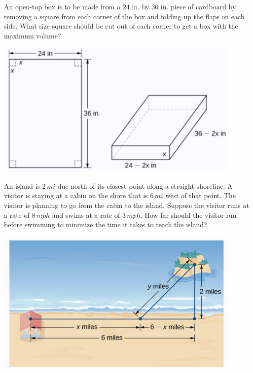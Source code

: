 \begin{example}

An open-top box is to be made from a \(24\) in. by \(36\) in. piece of
cardboard by removing a square from each corner of the box and folding
up the flaps on each side. What size square should be cut out of each
corner to get a box with the maximum volume?

\includegraphics[width=0.9\textwidth]{img/image-20200420233831196.png}

\end{example}
\vspace*{6\baselineskip}

\begin{example}

An island is \(2\,mi\) due north of its closest point along a straight
shoreline. A visitor is staying at a cabin on the shore that is
\(6\,mi\) west of that point. The visitor is planning to go from the
cabin to the island. Suppose the visitor runs at a rate of \(8\,mph\)
and swims at a rate of \(3\,mph\). How far should the visitor run before
swimming to minimize the time it takes to reach the island?

\includegraphics[width=0.9\textwidth]{img/image-20200420234008040.png}

\end{example}
\vspace*{6\baselineskip}


